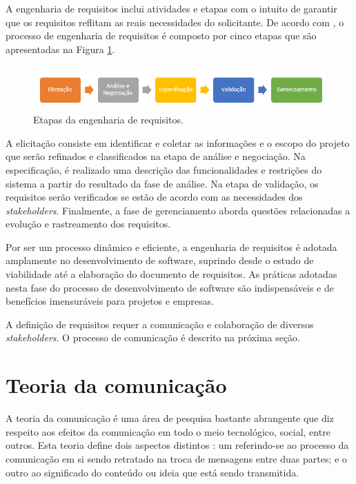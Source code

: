     A engenharia de requisitos inclui atividades e etapas com o intuito de garantir que os requisitos reflitam as reais necessidades do solicitante. De acordo com \cite{kotonya}, o processo de engenharia de requisitos é composto por cinco etapas que são apresentadas na Figura \ref{fig:etapasRE}. 
    
    
    \begin{figure}[h!] %
	\caption{Etapas da engenharia de requisitos.}
	\begin{center}
	    \includegraphics[scale=0.8]{figuras/ER} %
	\end{center}
	\label{fig:etapasRE}
\end{figure}
    
    A elicitação consiste em identificar e coletar as informações e o escopo do projeto que serão refinados e classificados na etapa de análise e negociação. Na especificação, é realizado uma descrição das funcionalidades e restrições do sistema a partir do resultado da fase de análise. Na etapa de validação, os requisitos serão verificados se estão de acordo com as necessidades dos \emph{stakeholders}. Finalmente, a fase de gerenciamento aborda questões relacionadas a evolução e rastreamento dos requisitos.
    
    Por ser um processo dinâmico e eficiente, a engenharia de requisitos é adotada amplamente no desenvolvimento de software, suprindo desde o estudo de viabilidade até a elaboração do documento de requisitos. As práticas adotadas nesta fase do processo de desenvolvimento de software são indispensáveis e de benefícios imensuráveis para projetos e empresas.
    
    A definição de requisitos requer a comunicação e colaboração de diversos \emph{stakeholders}. O processo de comunicação é descrito na próxima seção.
\section{Teoria da comunicação} \label{sec:fund_comunicacao}

A teoria da comunicação é uma área de pesquisa bastante abrangente que diz respeito aos efeitos da comunicação em todo o meio tecnológico, social, entre outros. Esta teoria define dois aspectos distintos \cite{pernstal}: um referindo-se ao processo da comunicação em si sendo retratado na troca de mensagens entre duas partes; e o outro ao significado do conteúdo ou ideia que está sendo transmitida.

